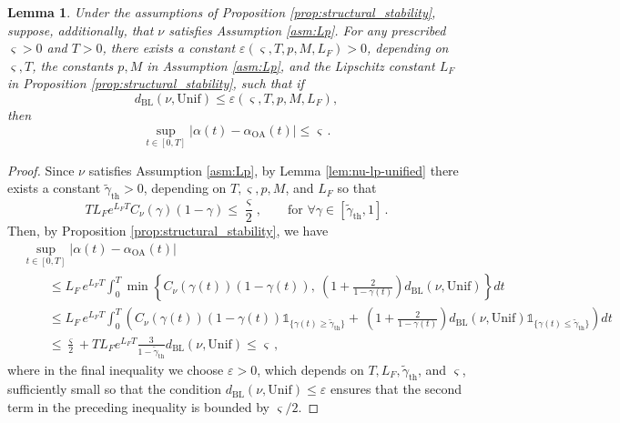\documentclass[10pt]{article}
\newtheorem{lemma}[theorem]{Lemma}
\theoremstyle{definition}
\theoremstyle{definition}
\numberwithin{equation}{section}
\newcommand{\BL}{\mathrm{BL}}
\newcommand{\WGammaTH}{\widetilde{\gamma}_{\mathrm{th}}}
\newcommand{\Unif}{\mathrm{Unif}}
\newcommand{\OA}{\mathrm{OA}}
\begin{document}
\begin{lemma}\label{lem:stability_estimate_control}
Under the assumptions of Proposition \ref{prop:structural_stability}, suppose, additionally, that $\nu$ satisfies Assumption \ref{asm:Lp}.
For any prescribed $\varsigma > 0$ and $T > 0$, there exists a constant $\varepsilon (\varsigma, T, p, M, L_F) > 0$, depending on $\varsigma, T$, the constants $p, M$ in Assumption \ref{asm:Lp}, and the Lipschitz constant $L_F$ in Proposition \ref{prop:structural_stability}, such that if
\begin{equation*}
d_{\BL} (\nu, \Unif) \leq \varepsilon (\varsigma, T, p, M, L_F),
\end{equation*}
then
\begin{equation*}
\sup_{t \in [0,T]} \left| \alpha(t) - \alpha_{\OA}(t) \right| \leq \varsigma \, .
\end{equation*}
\end{lemma}

\begin{proof}
Since $\nu$ satisfies Assumption \ref{asm:Lp}, by Lemma \ref{lem:nu-lp-unified} there exists a constant $\WGammaTH > 0$, depending on $T, \varsigma, p, M$, and $L_F$ so that
\begin{equation*}
T L_F e^{L_F T} C_{\nu} (\gamma) (1 - \gamma) \leq \frac{\varsigma}{2}, \qquad \text{for } \forall \gamma \in [\WGammaTH, 1] \, .
\end{equation*}
Then, by Proposition \ref{prop:structural_stability}, we have
\begin{equation*}
\begin{aligned}
&\sup_{t \in [0,T]} \left| \alpha(t) - \alpha_{\OA} (t) \right|\\
& \qquad  \leq L_{F}\,e^{L_{F} T} \int_0^T \min \left\{ C_{\nu} (\gamma(t)) (1 - \gamma(t)), \ \left( 1 + \frac{2}{1 - \gamma(t)} \right)
 d_{\BL}(\nu,\Unif) \right\} dt \\
& \qquad \leq L_{F}\,e^{L_{F} T} \int_0^T \left( C_{\nu} (\gamma(t)) (1 - \gamma(t)) \mathds{1}_{\{\gamma(t) \geq \WGammaTH\}} + \ \left( 1 + \frac{2}{1 - \gamma(t)} \right)
d_{\BL}(\nu,\Unif) \mathds{1}_{\{\gamma(t) \leq \WGammaTH\}} \right) dt\\
& \qquad \leq \frac{\varsigma}{2} + T L_F e^{L_F T} \frac{ 3 }{1 - \WGammaTH} d_{\BL} (\nu, \Unif) \leq \varsigma \,,
\end{aligned}
\end{equation*}
where in the final inequality we choose $\varepsilon > 0$, which depends on $T, L_F, \WGammaTH$, and $\varsigma$, sufficiently small so that the condition $d_{\BL} (\nu, \Unif) \leq \varepsilon$ ensures that the second term in the preceding inequality is bounded by $\varsigma/2$.
\end{proof}
\end{document}
